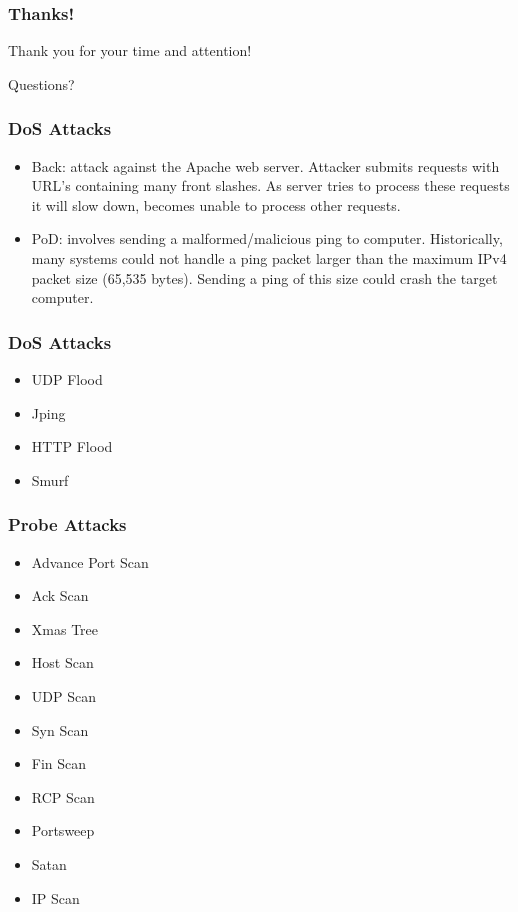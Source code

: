 \documentclass{beamer}
\newcommand{\linespace}{\vskip 0.25cm}
\begin{document}
\begin{frame}
	\frametitle{Thanks!}
	
	Thank you for your time and attention!
		
	\linespace
	\linespace
	
	\begin{center}
	{\Large Questions?}
	\end{center}
\end{frame}


\begin{frame}
	\frametitle{DoS Attacks}
	\begin{itemize}
		\item Back: attack against the Apache web server. Attacker submits requests with URL's containing many front slashes. As server tries to process these requests it will slow down, becomes unable to process other requests.
		\linespace
		\linespace
		\item PoD: involves sending a malformed/malicious ping to computer. Historically, many systems could not handle a ping packet larger than the maximum IPv4 packet size (65,535 bytes). Sending a ping of this size could crash the target computer.
	\end{itemize}
\end{frame}


\begin{frame}
	\frametitle{DoS Attacks}
	\begin{itemize}
		\item UDP Flood
		\item Jping
		\item HTTP Flood
		\item Smurf
	\end{itemize}
\end{frame}


\begin{frame}
	\frametitle{Probe Attacks}
	\begin{itemize}
		\item Advance Port Scan
		\item Ack Scan
		\item Xmas Tree
		\item Host Scan
		\item UDP Scan
		\item Syn Scan
		\item Fin Scan
		\item RCP Scan
		\item Portsweep
		\item Satan
		\item IP Scan
	\end{itemize}
\end{frame}
\end{document}
